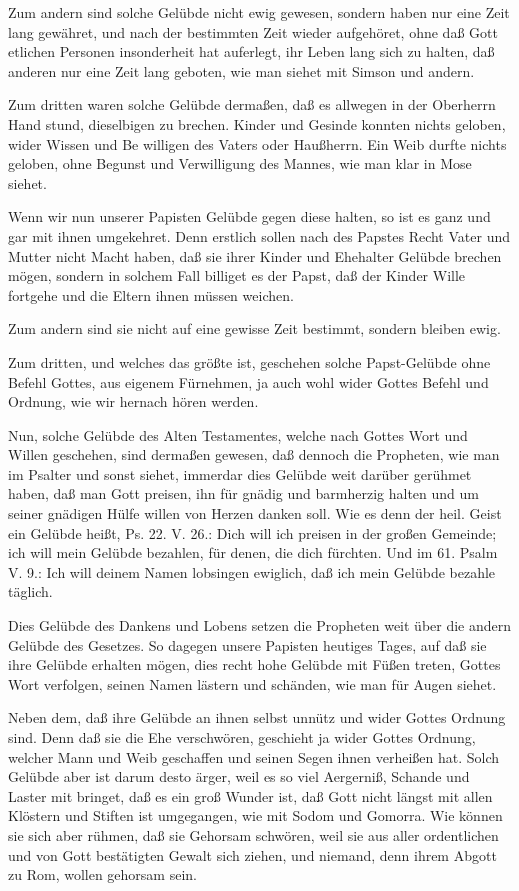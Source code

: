 Zum andern sind solche Gelübde nicht ewig gewesen, sondern haben nur eine Zeit lang gewähret, und nach der bestimmten Zeit wieder aufgehöret, ohne daß Gott etlichen Personen insonderheit hat auferlegt, ihr Leben lang sich zu halten, daß anderen nur eine Zeit lang geboten, wie man siehet mit Simson und andern.

Zum dritten waren solche Gelübde dermaßen, daß es allwegen in der Oberherrn Hand stund, dieselbigen zu brechen. Kinder und Gesinde konnten nichts geloben, wider Wissen und Be%
willigen
des Vaters oder Haußherrn. Ein Weib durfte nichts geloben, ohne Begunst und Verwilligung des Mannes, wie man klar in Mose siehet.

Wenn wir nun unserer Papisten Gelübde gegen diese halten, so ist es ganz und gar mit ihnen umgekehret. Denn erstlich sollen nach des Papstes Recht Vater und Mutter nicht Macht haben, daß sie ihrer Kinder und Ehehalter Gelübde brechen mögen, sondern in solchem Fall billiget es der Papst, daß der Kinder Wille fortgehe und die Eltern ihnen müssen weichen.

Zum andern sind sie nicht auf eine gewisse Zeit bestimmt, sondern bleiben ewig.

Zum dritten, und welches das größte ist, geschehen solche Papst-Gelübde ohne Befehl Gottes, aus eigenem Fürnehmen, ja auch wohl wider Gottes Befehl und Ordnung, wie wir hernach hören werden.

Nun, solche Gelübde des Alten Testamentes, welche nach Gottes Wort und Willen geschehen, sind dermaßen gewesen, daß dennoch die Propheten, wie man im Psalter und sonst siehet, immerdar dies Gelübde weit darüber gerühmet haben, daß man Gott preisen, ihn für gnädig und barmherzig halten und um seiner gnädigen Hülfe willen von Herzen danken soll. Wie es denn der heil. Geist ein Gelübde heißt, Ps. 22. V. 26.: Dich will ich preisen in der großen Gemeinde; ich will mein Gelübde bezahlen, für denen, die dich fürchten. Und im 61. Psalm V. 9.: Ich will deinem Namen lobsingen ewiglich, daß ich mein Gelübde bezahle täglich.

Dies Gelübde des Dankens und Lobens setzen die Propheten weit über die andern Gelübde des Gesetzes. So dagegen unsere Papisten heutiges Tages, auf daß sie ihre Gelübde erhalten mögen, dies recht hohe Gelübde mit Füßen treten, Gottes Wort verfolgen, seinen Namen lästern und schänden, wie man für Augen siehet.

Neben dem, daß ihre Gelübde an ihnen selbst unnütz und wider Gottes Ordnung sind. Denn daß sie die Ehe verschwören, geschieht ja wider Gottes Ordnung, welcher Mann und Weib geschaffen und seinen Segen ihnen verheißen hat. Solch Gelübde aber ist darum desto ärger, weil es so viel Aergerniß, Schande und Laster mit bringet, daß es ein groß Wunder ist, daß Gott nicht längst mit allen Klöstern und Stiften ist umgegangen, wie mit Sodom und Gomorra. Wie können sie sich aber rühmen, daß sie Gehorsam schwören, weil sie aus aller ordentlichen und von Gott bestätigten Gewalt sich ziehen, und niemand, denn ihrem Abgott zu Rom, wollen gehorsam sein.

